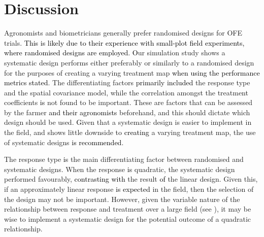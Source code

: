 \documentclass[a4paper]{article} 	%
\newcommand{\Matern}{Mat\'ern }
\newcommand{\zc}[1]{\textcolor{black}{#1}}
\begin{document}
\section{Discussion}\label{Sec:Dis}

Agronomists and biometricians generally prefer randomised designs for OFE trials. \zc{This is likely due to their experience with small-plot field experiments, where randomised designs are employed.} \zc{O}ur simulation study shows a systematic design performs either preferably or similarly to a randomised design for the purposes of creating a varying treatment map \zc{when using the performance metrics stated}. The differentiating factors \zc{primarily included} the response type and the spatial covariance model, while the correlation amongst the treatment coefficients \zc{is} not found to be important. These are factors that can be assessed by the farmer \zc{and their agronomists} beforehand, and this should dictate which design should be used. \zc{G}iven that a systematic design is easier to implement in the field, and shows little downside to \zc{creating} a varying treatment map, the use of systematic designs \zc{is recommended}. 

The response type \zc{is} the main differentiating factor between randomised and systematic designs. When the response \zc{is} quadratic, the systematic design performed favourably, \zc{contrasting with} the result \zc{of} the linear design. Given this, if an approximately linear response \zc{is expected} in the field, then the selection of the design may not be important. However, given the variable nature of the relationship between response and treatment over a large field (see \textcite{Rakshit2020Novel}), it may be wise to implement a systematic design for the potential outcome of a quadratic relationship. 

\end{document}
